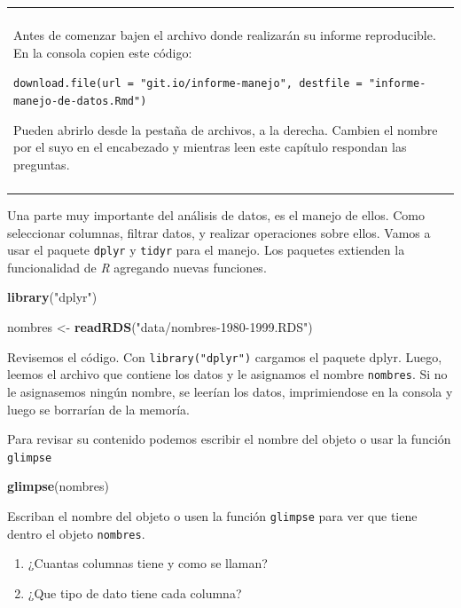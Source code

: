 \documentclass[]{book}
\newenvironment{Shaded}{\begin{snugshade}}{\end{snugshade}}
\newcommand{\KeywordTok}[1]{\textcolor[rgb]{0.13,0.29,0.53}{\textbf{#1}}}
\newcommand{\NormalTok}[1]{#1}
\newcommand{\StringTok}[1]{\textcolor[rgb]{0.31,0.60,0.02}{#1}}
\providecommand{\tightlist}{%
  \setlength{\itemsep}{0pt}\setlength{\parskip}{0pt}}
\newenvironment{atencion}
    {\begin{center}
    \begin{tabular}{|p{0.9\textwidth}|}
    \hline\\
    }
    { 
    \\\\\hline
    \end{tabular} 
    \end{center}
    }
\theoremstyle{definition}
\theoremstyle{definition}
\theoremstyle{definition}
\theoremstyle{remark}
\let\BeginKnitrBlock\begin \let\EndKnitrBlock\end
\begin{document}
\begin{atencion}
Antes de comenzar bajen el archivo donde realizarán su informe
reproducible. En la consola copien este código:

\texttt{download.file(url\ =\ "git.io/informe-manejo",\ destfile\ =\ "informe-manejo-de-datos.Rmd")}

Pueden abrirlo desde la pestaña de archivos, a la derecha. Cambien el
nombre por el suyo en el encabezado y mientras leen este capítulo
respondan las preguntas.
\end{atencion}

Una parte muy importante del análisis de datos, es el manejo de ellos.
Como seleccionar columnas, filtrar datos, y realizar operaciones sobre
ellos. Vamos a usar el paquete \texttt{dplyr} y \texttt{tidyr} para el
manejo. Los paquetes extienden la funcionalidad de \emph{R} agregando
nuevas funciones.

\begin{Shaded}
\begin{Highlighting}[]
\KeywordTok{library}\NormalTok{(}\StringTok{"dplyr"}\NormalTok{)}

\NormalTok{nombres <-}\StringTok{ }\KeywordTok{readRDS}\NormalTok{(}\StringTok{"data/nombres-1980-1999.RDS"}\NormalTok{)}
\end{Highlighting}
\end{Shaded}

Revisemos el código. Con \texttt{library("dplyr")} cargamos el paquete
dplyr. Luego, leemos el archivo que contiene los datos y le asignamos el
nombre \texttt{nombres}. Si no le asignasemos ningún nombre, se leerían
los datos, imprimiendose en la consola y luego se borrarían de la
memoría.

Para revisar su contenido podemos escribir el nombre del objeto o usar
la función \texttt{glimpse}

\begin{Shaded}
\begin{Highlighting}[]
\KeywordTok{glimpse}\NormalTok{(nombres)}
\end{Highlighting}
\end{Shaded}

\BeginKnitrBlock{exercise}
\protect\hypertarget{exr:ejercicio-4}{}{\label{exr:ejercicio-4} }Escriban el
nombre del objeto o usen la función \texttt{glimpse} para ver que tiene
dentro el objeto \texttt{nombres}.

\begin{enumerate}
\def\labelenumi{\arabic{enumi}.}
\tightlist
\item
  ¿Cuantas columnas tiene y como se llaman?
\item
  ¿Que tipo de dato tiene cada columna?
\end{enumerate}
\EndKnitrBlock{exercise}
\end{document}
